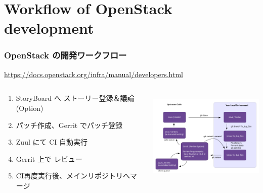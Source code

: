 \documentclass[aspectratio=169,11pt,hyperref={colorlinks=true}]{beamer}
\begin{document}
\section{Workflow of OpenStack development}
\begin{frame}
  \frametitle{OpenStack の開発ワークフロー}
  \url{https://docs.openstack.org/infra/manual/developers.html}
  \begin{columns}[T]
    \begin{column}{0.5\textwidth}
      \begin{enumerate}
        \item StoryBoard へ ストーリー登録＆議論 (Option)
        \item パッチ作成、Gerrit でパッチ登録
        \item Zuul にて CI 自動実行
        \item Gerrit 上で レビュー
        \item CI再度実行後、メインリポジトリへマージ
      \end{enumerate}
    \end{column}
    \begin{column}{0.4\textwidth}
      \centering\includegraphics[height=45mm]{images/code_review.png}
    \end{column}
  \end{columns}
\end{frame}
\end{document}
